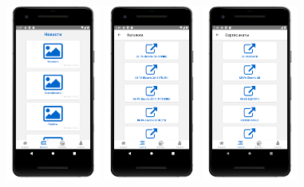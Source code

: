 \begin{figure}[!htb]\centering
    \begin{minipage}{0.16\textwidth}
        \centering

        \includegraphics[height=5.8cm]
        {images/mobile/articles/articles.png}
    \end{minipage}
    \begin{minipage}{0.16\textwidth}
        \centering

        \includegraphics[height=5.8cm]
        {images/mobile/articles/article_catalogs.png}
    \end{minipage}
    \begin{minipage}{0.16\textwidth}
        \centering

        \includegraphics[height=5.8cm]
        {images/mobile/articles/article_certificates.png}
    \end{minipage}
    \begin{minipage}{0.16\textwidth}
        \centering


\end{minipage}
\end{figure}
